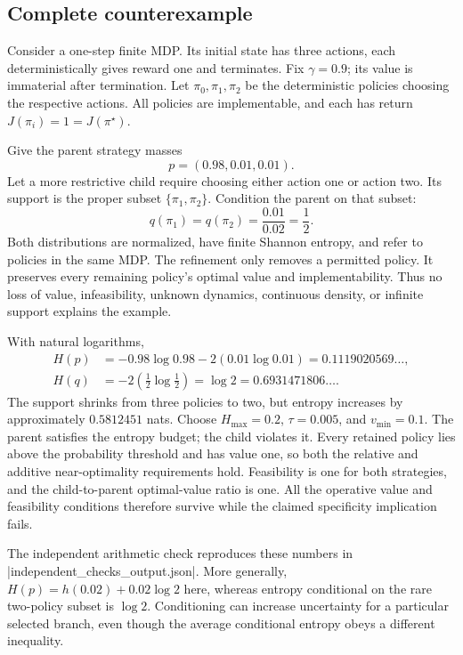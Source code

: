 \documentclass[10pt]{article}
\begin{document}
\subsection*{Complete counterexample}
Consider a one-step finite MDP. Its initial state has three actions, each deterministically gives reward one and terminates. Fix \(\gamma=0.9\); its value is immaterial after termination. Let \(\pi_0,\pi_1,\pi_2\) be the deterministic policies choosing the respective actions. All policies are implementable, and each has return \(J(\pi_i)=1=J(\pi^\star)\).\par
Give the parent strategy masses \[p=(0.98,0.01,0.01).\] Let a more restrictive child require choosing either action one or action two. Its support is the proper subset \(\{\pi_1,\pi_2\}\). Condition the parent on that subset: \[q(\pi_1)=q(\pi_2)=\frac{0.01}{0.02}=\frac12.\] Both distributions are normalized, have finite Shannon entropy, and refer to policies in the same MDP. The refinement only removes a permitted policy. It preserves every remaining policy’s optimal value and implementability. Thus no loss of value, infeasibility, unknown dynamics, continuous density, or infinite support explains the example.\par
With natural logarithms, \[\begin{aligned}
 H(p)&=-0.98\log0.98-2(0.01\log0.01)
       =0.1119020569\ldots,\\
 H(q)&=-2\left(\tfrac12\log\tfrac12\right)
       =\log2=0.6931471806\ldots.\end{aligned}\] The support shrinks from three policies to two, but entropy increases by approximately \(0.5812451\) nats. Choose \(H_{\max}=0.2\), \(\tau=0.005\), and \(v_{\min}=0.1\). The parent satisfies the entropy budget; the child violates it. Every retained policy lies above the probability threshold and has value one, so both the relative and additive near-optimality requirements hold. Feasibility is one for both strategies, and the child-to-parent optimal-value ratio is one. All the operative value and feasibility conditions therefore survive while the claimed specificity implication fails.\par
The independent arithmetic check reproduces these numbers in |independent\_checks\_output.json|. More generally, \(H(p)=h(0.02)+0.02\log2\) here, whereas entropy conditional on the rare two-policy subset is \(\log2\). Conditioning can increase uncertainty for a particular selected branch, even though the average conditional entropy obeys a different inequality.\par
\end{document}
